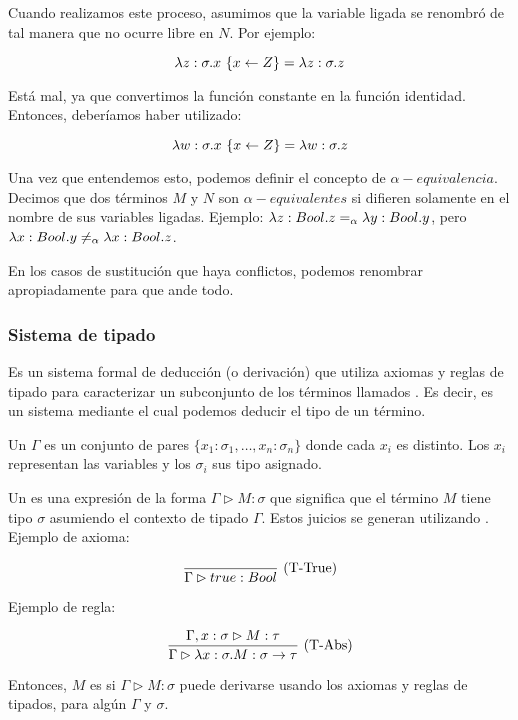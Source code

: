 Cuando realizamos este proceso, asumimos que la variable ligada se renombró de tal manera que no ocurre libre en $N$. Por ejemplo:

\[ \lambda z:\sigma.x\ \{x\leftarrow Z\} = \lambda z:\sigma.z\]

Está mal, ya que convertimos la función constante  en la función identidad. Entonces, deberíamos haber utilizado:

\[ \lambda w:\sigma.x\ \{x\leftarrow Z\} = \lambda w:\sigma.z\]

Una vez que entendemos esto, podemos definir el concepto de $\alpha-equivalencia$. Decimos que dos términos $M$ y $N$ son $\alpha-equivalentes$ si difieren solamente en el nombre de sus variables ligadas. Ejemplo: $\lambda z:Bool.z =_{\alpha} \lambda y:Bool.y$, pero $\lambda x:Bool.y \neq_{\alpha} \lambda x:Bool.z$.

En los casos de sustitución que haya conflictos, podemos renombrar apropiadamente para que ande todo.

\subsubsection{Sistema de tipado}

Es un sistema formal de deducción (o derivación) que utiliza axiomas y reglas de tipado para caracterizar un subconjunto de los términos llamados . Es decir, es un sistema mediante el cual podemos deducir el tipo de un término.

Un  $\Gamma$ es un conjunto de pares $\{x_1:\sigma_1,\dots,x_n:\sigma_n\}$ donde cada $x_i$ es distinto. Los $x_i$ representan las variables y los $\sigma_i$ sus tipo asignado.

Un  es una expresión de la forma $\Gamma \rhd M : \sigma$ que significa que el término $M$ tiene tipo $\sigma$ asumiendo el contexto de tipado $\Gamma$. Estos juicios se generan utilizando . Ejemplo de axioma:

\[\frac{}{\Gamma \rhd true : Bool}\ \text{(T-True)}\]

Ejemplo de regla:

\[\frac{\Gamma, x : \sigma \rhd M : \tau}{\Gamma \rhd \lambda x:\sigma.M:\sigma\to\tau}\ \text{(T-Abs)}\]

\vspace{0.5em}
Entonces, $M$ es   si $\Gamma \rhd M : \sigma$ puede derivarse usando los axiomas y reglas de tipados, para algún $\Gamma$ y $\sigma$.

